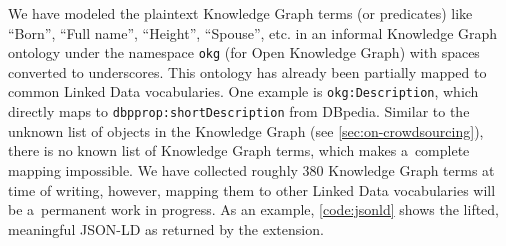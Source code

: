 \documentclass[runningheads,a4paper]{llncs}
\begin{document}

We have modeled the plaintext Knowledge Graph terms (or predicates)
like ``Born'', ``Full name'', ``Height'', ``Spouse'', etc.
in an informal Knowledge Graph ontology under the namespace \texttt{okg}
(for Open Knowledge Graph) with spaces converted to underscores.
This ontology has already been partially mapped to common Linked Data vocabularies.
One example is \texttt{okg:Description},
which directly maps to \texttt{dbpprop:shortDescription} from DBpedia.
Similar to the unknown list of objects in the Knowledge Graph (see \autoref{sec:on-crowdsourcing}),
there is no known list of Knowledge Graph terms,
which makes a~complete mapping impossible.
We have collected roughly 380 Knowledge Graph terms
at time of writing, however, mapping them to other Linked Data vocabularies
will be a~permanent work in progress.
As an example, \autoref{code:jsonld} shows the lifted, meaningful JSON-LD as returned by the extension.
\end{document}

